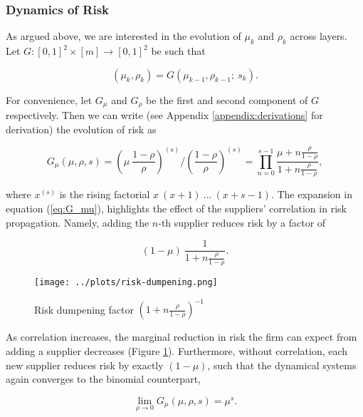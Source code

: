 \documentclass[draft, american, abstract=on]{scrartcl}
\theoremstyle{plain}
\begin{document}
\subsubsection{Dynamics of Risk}

As argued above, we are interested in the evolution of $\mu_k$ and $\rho_k$ across layers. Let $G: [0, 1]^2 \times [m] \to [0, 1]^2$ be such that

\begin{equation}
  (\mu_k, \rho_k) = G(\mu_{k - 1}, \rho_{k - 1}; \ s_k).
\end{equation}

For convenience, let $G_{\mu}$ and $G_{\rho}$ be the first and second component of $G$ respectively. Then we can write (see Appendix \ref{appendix:derivations} for derivation) the evolution of risk as

\begin{equation} \label{eq:G_mu}
  G_\mu(\mu, \rho, s) = \left( \mu \  \frac{1 - \rho}{\rho} \right)^{(s)} \Big/ \left(\frac{1 - \rho}{\rho} \right)^{(s)} = \prod^{s - 1}_{n = 0} \frac{\mu + n \frac{\rho}{1 - \rho}}{1 + n \frac{\rho}{1 - \rho}},
\end{equation}

where $x^{(s)}$ is the rising factorial $x \ (x + 1) \ \ldots \ (x + s - 1)$. The expansion in equation (\ref{eq:G_mu}), highlights the effect of the suppliers' correlation in risk propagation. Namely, adding the $n$-th supplier reduces risk by a factor of 

\begin{equation}
  (1 - \mu) \ \frac{1}{1 + n \frac{\rho}{1 - \rho}}.
\end{equation}

\begin{figure}[H]
  \centering
  \texttt{[image: ../plots/risk-dumpening.png]}
  \caption{Risk dumpening factor $\left(1 + n \frac{\rho}{1 - \rho}\right)^{-1}$}
  \label{fig:risk-dumpening}
\end{figure}

As correlation increases, the marginal reduction in risk the firm can expect from adding a supplier decreases (Figure \ref{fig:risk-dumpening}). Furthermore, without correlation, each new supplier reduces risk by exactly $(1-\mu)$, such that the dynamical systems again converges to the binomial counterpart,

\begin{equation}
  \lim_{\rho \rightarrow 0} G_\mu(\mu, \rho, s) = \mu^s.
\end{equation}
\end{document}

